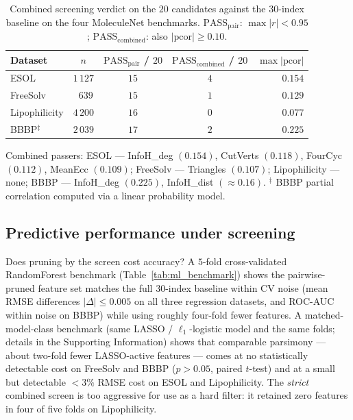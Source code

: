 \documentclass[11pt,a4paper]{article}
\theoremstyle{definition}
\begin{document}
\begin{table}[h]
\centering
\caption{Combined screening verdict on the $20$ candidates against the $30$-index baseline on the four MoleculeNet benchmarks. $\mathrm{PASS}_{\mathrm{pair}}$: $\max|r|<0.95$; $\mathrm{PASS}_{\mathrm{combined}}$: also $|\mathrm{pcor}|\ge 0.10$.}
\label{tab:novel_combined}
\begin{tabular}{lcccr}
\toprule
Dataset & $n$ & $\mathrm{PASS}_{\mathrm{pair}}$ / $20$ & $\mathrm{PASS}_{\mathrm{combined}}$ / $20$ & $\max|\mathrm{pcor}|$\\
\midrule
ESOL          & $1\,127$ & $15$ & $4$ & $0.154$\\
FreeSolv      & $\phantom{0}639$  & $15$ & $1$ & $0.129$\\
Lipophilicity & $4\,200$ & $16$ & $0$ & $0.077$\\
BBBP$^\ddag$  & $2\,039$ & $17$ & $2$ & $0.225$\\
\bottomrule
\end{tabular}

\vspace{0.4em}
\noindent\small{Combined passers: ESOL --- InfoH\_deg $(0.154)$, CutVerts $(0.118)$, FourCyc $(0.112)$, MeanEcc $(0.109)$; FreeSolv --- Triangles $(0.107)$; Lipophilicity --- none; BBBP --- InfoH\_deg $(0.225)$, InfoH\_dist $(\approx 0.16)$. $^\ddag$ BBBP partial correlation computed via a linear probability model.}
\end{table}

\subsection{Predictive performance under screening}

Does pruning by the screen cost accuracy? A $5$-fold
cross-validated RandomForest benchmark
(Table~\ref{tab:ml_benchmark}) shows the pairwise-pruned feature
set matches the full $30$-index baseline within CV noise (mean RMSE
differences $|\Delta|\le 0.005$ on all three regression datasets,
and ROC-AUC within noise on BBBP) while using roughly four-fold
fewer features. A matched-model-class benchmark (same LASSO /
$\ell_1$-logistic model and the same folds; details in the
Supporting Information) shows that comparable parsimony --- about
two-fold fewer LASSO-active features --- comes at no statistically
detectable cost on FreeSolv and BBBP ($p > 0.05$, paired $t$-test)
and at a small but detectable $<3\%$ RMSE cost on ESOL and
Lipophilicity. The \emph{strict} combined screen is too aggressive
for use as a hard filter: it retained zero features in four of five
folds on Lipophilicity.
\end{document}
